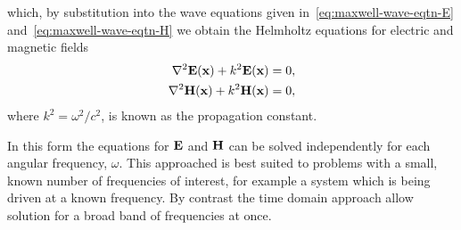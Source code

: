 which, by substitution into the wave equations given
in~\eqref{eq:maxwell-wave-eqtn-E} and~\eqref{eq:maxwell-wave-eqtn-H} we obtain
the Helmholtz equations for electric and magnetic fields
\begin{align}
  \label{eq:helmholtz}
  \nabla^2 \mathbf{E}(\mathbf{x}) + k^2 \mathbf{E}(\mathbf{x}) = 0, \\
  \nabla^2 \mathbf{H}(\mathbf{x}) + k^2 \mathbf{H}(\mathbf{x}) = 0,
\end{align}
where $k^2 =\omega^2/c^2$, is known as the propagation constant.

In this form the equations for $\mathbf{E}$ and $\mathbf{H}$ can be solved independently for
each angular frequency, $\omega$. This approached is best suited to problems
with a small, known number of frequencies of interest, for example a system which is
being driven at a known frequency. By contrast the time domain approach allow
solution for a broad band of frequencies at once.




